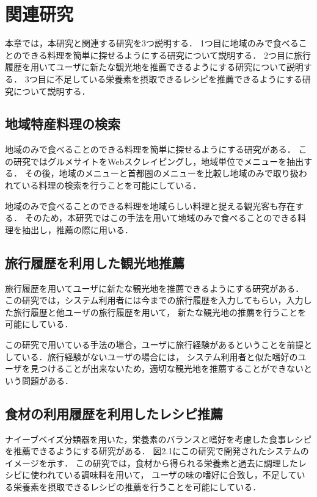 \documentclass{funthesis}
\begin{document}

\chapter{関連研究}
本章では，本研究と関連する研究を3つ説明する．
1つ目に地域のみで食べることのできる料理を簡単に探せるようにする研究について説明する．
2つ目に旅行履歴を用いてユーザに新たな観光地を推薦できるようにする研究について説明する．
3つ目に不足している栄養素を摂取できるレシピを推薦できるようにする研究について説明する．

\section{地域特産料理の検索}
地域のみで食べることのできる料理を簡単に探せるようにする研究がある\cite{6}．
この研究ではグルメサイトをWebスクレイピングし，地域単位でメニューを抽出する．
その後，地域のメニューと首都圏のメニューを比較し地域のみで取り扱われている料理の検索を行うことを可能にしている．

地域のみで食べることのできる料理を地域らしい料理と捉える観光客も存在する．
そのため，本研究ではこの手法を用いて地域のみで食べることのできる料理を抽出し，推薦の際に用いる．

\section{旅行履歴を利用した観光地推薦}
旅行履歴を用いてユーザに新たな観光地を推薦できるようにする研究がある\cite{7}．
この研究では，システム利用者には今までの旅行履歴を入力してもらい，入力した旅行履歴と他ユーザの旅行履歴を用いて，
新たな観光地の推薦を行うことを可能にしている．

この研究で用いている手法の場合，ユーザに旅行経験があるということを前提としている．旅行経験がないユーザの場合には，
システム利用者と似た嗜好のユーザを見つけることが出来ないため，適切な観光地を推薦することができないという問題がある．

\section{食材の利用履歴を利用したレシピ推薦}
ナイーブベイズ分類器を用いた，栄養素のバランスと嗜好を考慮した食事レシピを推薦できるようにする研究がある\cite{8}．
図2.1にこの研究で開発されたシステムのイメージを示す．
この研究では，食材から得られる栄養素と過去に調理したレシピに使われている調味料を用いて，
ユーザの味の嗜好に合致し，不足している栄養素を摂取できるレシピの推薦を行うことを可能にしている．
\end{document}
